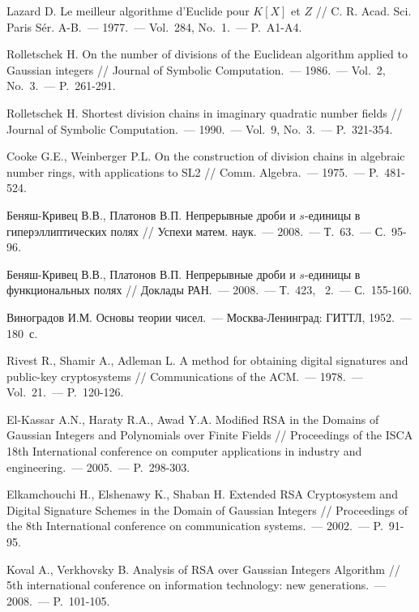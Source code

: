 \documentclass[_00_dissertation.tex]{subfiles}
\begin{document}
\begin{thebibliography}{99}
    Lazard D. Le meilleur algorithme d'{E}uclide pour {$K[X]$} et {$Z$} // C. R. Acad. Sci. Paris S\'er. A-B.~--- 1977.~--- Vol.~284, No.~1.~--- P.~A1-A4.

    Rolletschek H. On the number of divisions of the Euclidean algorithm applied to Gaussian integers // Journal of Symbolic Computation.~--- 1986.~--- Vol.~2, No.~3.~--- P.~261-291.
    
    Rolletschek H. Shortest division chains in imaginary quadratic number fields // Journal of Symbolic Computation.~--- 1990.~--- Vol.~9, No.~3.~--- P.~321-354.

    Cooke G.E., Weinberger P.L. On the construction of division chains in algebraic number rings, with applications to SL2 // Comm. Algebra.~--- 1975.~--- P.~481-524.

    Беняш-Кривец В.В., Платонов В.П. Непрерывные дроби и $s$-единицы в гиперэллиптических полях // Успехи матем. наук.~--- 2008.~--- Т.~63.~--- С.~95-96.
    
    Беняш-Кривец В.В., Платонов В.П. Непрерывные дроби и $s$-единицы в функциональных полях // Доклады РАН.~--- 2008.~--- Т.~423, \textnumero~2.~--- С.~155-160.

    Виноградов И.М. Основы теории чисел.~--- Москва-Ленинград: ГИТТЛ, 1952.~--- 180~с.

    Rivest R., Shamir A., Adleman L. A method for obtaining digital signatures and public-key cryptosystems // Communications of the ACM.~--- 1978.~--- Vol.~21.~--- P.~120-126.

    El-Kassar A.N., Haraty R.A., Awad Y.A. Modified RSA in the Domains of Gaussian Integers and Polynomials over Finite Fields // Proceedings of the ISCA 18th International conference on computer applications in industry and engineering.~--- 2005.~--- P.~298-303.

    Elkamchouchi H., Elshenawy K., Shaban H. Extended RSA Cryptosystem and Digital Signature Schemes in the Domain of Gaussian Integers // Proceedings of the 8th International conference on communication systems.~--- 2002.~--- P.~91-95.

    Koval A., Verkhovsky B. Analysis of RSA over Gaussian Integers Algorithm // 5th international conference on information technology: new generations.~--- 2008.~--- P.~101-105.


\end{thebibliography}
\end{document}
